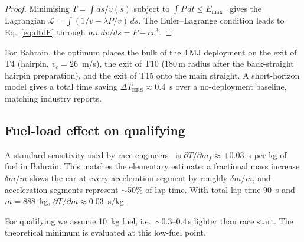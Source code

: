 \documentclass[11pt,twocolumn]{article}
\theoremstyle{definition}
\theoremstyle{remark}
\begin{document}
\begin{proof}[Proof]
Minimising $T = \int ds/v(s)$ subject to
$\int P\,dt \le E_{\max}$~\cite{pontryagin1962,bertsekas2005,aftalion2020}
gives the Lagrangian
$\mathcal{L} = \int (1/v - \lambda P/v)\,ds$. The Euler--Lagrange condition
leads to Eq.~\eqref{eq:dtdE} through $m v\, dv/ds = P - cv^3$.
\end{proof}

For Bahrain, the optimum places the bulk of the 4\,MJ deployment on the
exit of T4 (hairpin, $v_c = 26$~m/s), the exit of T10 (180\,m radius after
the back-straight hairpin preparation), and the exit of T15 onto the main
straight. A short-horizon model gives a total time saving
$\Delta T_{\mathrm{ERS}} \approx 0.4$~s over a no-deployment baseline,
matching industry reports.

\subsection{Fuel-load effect on qualifying}

A standard sensitivity used by race engineers~\cite{gadola2014,toet2013,dixon2007}
is $\partial T / \partial m_f \approx +0.03$~s per kg of fuel in Bahrain. This
matches the elementary estimate: a fractional mass increase $\delta m/m$
slows the car at every acceleration segment by roughly $\delta m/m$, and
acceleration segments represent $\sim$50\% of lap time. With total lap
time 90~s and $m = 888$~kg, $\partial T/\partial m \approx 0.03$~s/kg.

For qualifying we assume 10~kg fuel, i.e.\ $\sim$0.3--0.4\,s lighter than
race start. The theoretical minimum is evaluated at this low-fuel point.
\end{document}
